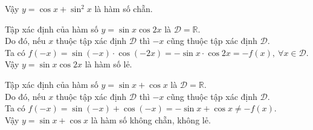 \begin{bt}
{\begin{listEX}[1]
			Vậy $y=\cos x+\sin^2 x$ là hàm số chẵn.	
			\item Tập xác định của hàm số $y=\sin x\cos 2x$ là $\mathscr{D}=\mathbb{R}$.\\
			Do đó, nếu $x$ thuộc tập xác định $\mathscr{D}$ thì $-x$ cũng thuộc tập xác định $\mathscr{D}$.\\
			Ta có $f(-x)=\sin (-x)\cdot\cos (-2x)=-\sin x\cdot\cos 2x= -f(x),~\forall x\in\mathscr{D}$.\\
			Vậy $y=\sin x\cos 2x$  là hàm số lẻ.
			\item Tập xác định của hàm số $y=\sin x+\cos x$ là $\mathscr{D}=\mathbb{R}$.\\
			Do đó, nếu $x$ thuộc tập xác định $\mathscr{D}$ thì $-x$ cũng thuộc tập xác định $\mathscr{D}$.\\
			Ta có $f(-x)=\sin (-x)+\cos (-x)=-\sin x+\cos x\ne-f(x)$.\\
			Vậy $y=\sin x+\cos x$  là hàm số không chẵn, không lẻ.
		\end{listEX}
	}
\end{bt}

